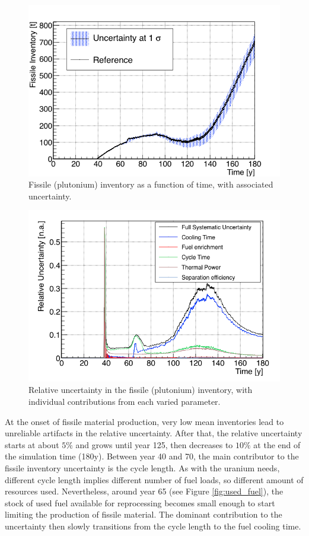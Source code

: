 \documentclass{anstrans}
\begin{document}
\begin{figure}[t] %
    \centering
    \includegraphics[scale=0.3]{pu_full}
    \caption{Fissile (plutonium) inventory as a function of time, with
      associated uncertainty.}\label{fig:pu_full}
\end{figure}

\begin{figure}[t] %
    \centering
    \includegraphics[scale=0.3]{pu_uncer}
    \caption{Relative uncertainty in the fissile (plutonium) inventory, with
      individual contributions from each varied parameter.}\label{fig:pu_uncer}
\end{figure}

At the onset of fissile material production, very low mean inventories lead to
unreliable artifacts in the relative uncertainty.  After that, the relative
uncertainty starts at about $5\%$ and grows until year 125, then decreases to
$10\%$ at the end of the simulation time (180y).  Between year 40 and 70, the
main contributor to the fissile inventory uncertainty is the cycle length.  As
with the uranium needs, different cycle length implies different number of fuel
loads, so different amount of resources used.  Nevertheless, around year 65 (see
Figure \ref{fig:used_fuel}), the stock of used fuel available for reprocessing
becomes small enough to start limiting the production of fissile material.  The
dominant contribution to the uncertainty then slowly transitions from the cycle
length to the fuel cooling time.
\end{document}
